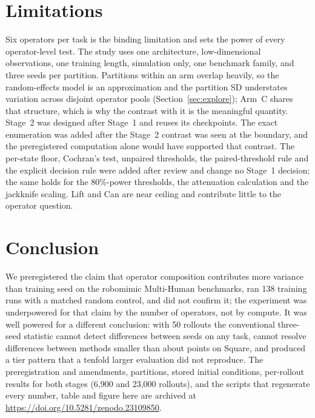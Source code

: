 \IfFileExists{IEEEtran.cls}{\documentclass[journal]{IEEEtran}}{\documentclass[10pt,twocolumn]{article}}
\begin{document}
\section{Limitations}
Six operators per task is the binding limitation and sets the power of every operator-level test. The study uses one architecture, low-dimensional observations, one training length, simulation only, one benchmark family, and three seeds per partition. Partitions within an arm overlap heavily, so the random-effects model is an approximation and the partition SD understates variation across disjoint operator pools (Section~\ref{sec:explore}); Arm~C shares that structure, which is why the contrast with it is the meaningful quantity. Stage~2 was designed after Stage~1 and reuses its checkpoints. The exact enumeration was added after the Stage~2 contrast was seen at the boundary, and the preregistered computation alone would have supported that contrast. The per-state floor, Cochran's test, unpaired thresholds, the paired-threshold rule and the explicit decision rule were added after review and change no Stage~1 decision; the same holds for the 80\%-power thresholds, the attenuation calculation and the jackknife scaling. Lift and Can are near ceiling and contribute little to the operator question.

\section{Conclusion}
We preregistered the claim that operator composition contributes more variance than training seed on the robomimic Multi-Human benchmarks, ran 138 training runs with a matched random control, and did not confirm it; the experiment was underpowered for that claim by the number of operators, not by compute. It was well powered for a different conclusion: with 50 rollouts the conventional three-seed statistic cannot detect differences between seeds on any task, cannot resolve differences between methods smaller than about \OneSqMDD{} points on Square, and produced a tier pattern that a tenfold larger evaluation did not reproduce. The preregistration and amendments, partitions, stored initial conditions, per-rollout results for both stages (6{,}900 and 23{,}000 rollouts), and the scripts that regenerate every number, table and figure here are archived at \url{https://doi.org/10.5281/zenodo.23109850}.


\end{document}
